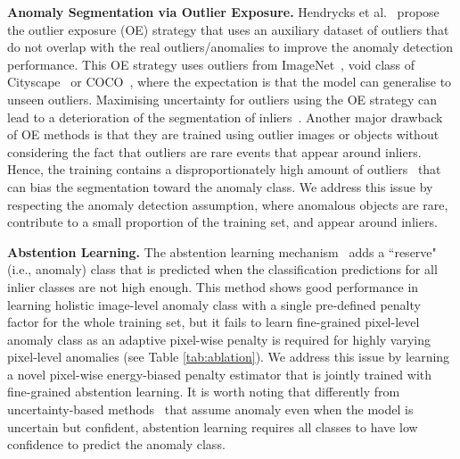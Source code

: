 \documentclass[runningheads]{llncs}
\begin{document}
\noindent\textbf{Anomaly Segmentation via Outlier Exposure.}
Hendrycks et al.~\cite{hendrycks2018deep}  propose the outlier exposure (OE) strategy that uses an auxiliary dataset of outliers that do not overlap with the real outliers/anomalies to improve the anomaly detection performance. 
This OE strategy uses outliers from ImageNet~\cite{bevandic2018discriminative,bevandic2019simultaneous,vandenhende2020revisiting,tian2020few}, void class of Cityscape~\cite{di2021pixel} or COCO~\cite{chan2021entropy}, where the expectation is that the model can generalise to unseen outliers.
Maximising uncertainty for outliers using the OE strategy can lead to a deterioration of the segmentation of inliers~\cite{bevandic2018discriminative,vandenhende2020revisiting}.
Another major drawback of OE methods is that they are trained using outlier images or objects without considering the fact that outliers are rare events that appear around inliers. Hence, the training contains a disproportionately high amount of outliers~\cite{chan2021entropy} that can bias the segmentation toward the anomaly class. We address this issue by respecting the anomaly detection assumption, where anomalous objects are rare, contribute to a small proportion of the training set, and appear around inliers.

\noindent\textbf{Abstention Learning.}
The abstention learning  mechanism~\cite{el2010foundations} adds a ``reserve" (i.e., anomaly) class that is predicted when the classification predictions for all inlier classes are not high enough. This method shows good performance in learning holistic image-level anomaly class with a single pre-defined penalty factor for the whole training set, but it fails to learn fine-grained pixel-level anomaly class as an adaptive pixel-wise penalty is required for highly varying pixel-level anomalies (see Table \ref{tab:ablation}). We address this issue by learning a novel pixel-wise energy-biased penalty estimator that is jointly trained with fine-grained abstention learning.
It is worth noting that differently from uncertainty-based methods~\cite{chan2021entropy,jung2021standardized,hendrycks2019scaling,blum2019fishyscapes} that assume anomaly even when the model is uncertain but confident, abstention learning requires all classes to have low confidence to predict the anomaly class.
\end{document}
